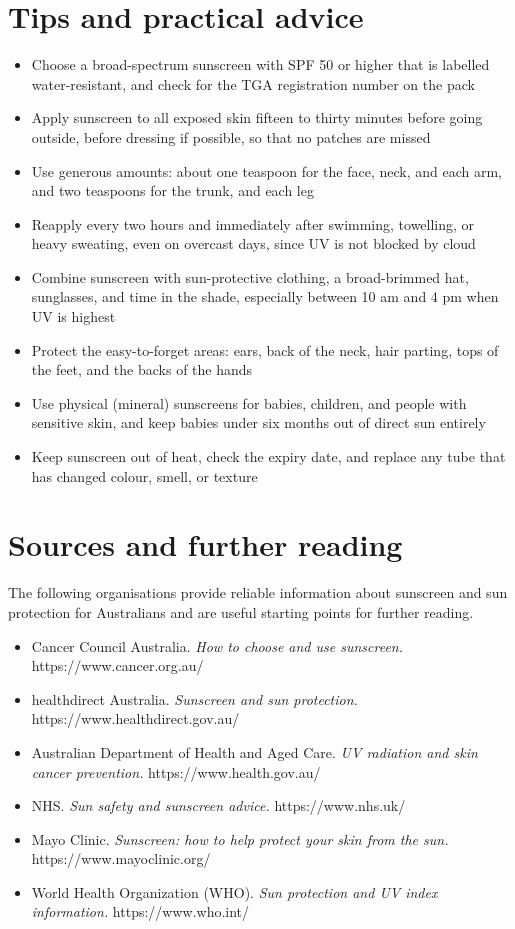 \section*{Tips and practical advice}
\begin{itemize}
    \item Choose a broad-spectrum sunscreen with SPF 50 or higher that is labelled water-resistant, and check for the TGA registration number on the pack
    \item Apply sunscreen to all exposed skin fifteen to thirty minutes before going outside, before dressing if possible, so that no patches are missed
    \item Use generous amounts: about one teaspoon for the face, neck, and each arm, and two teaspoons for the trunk, and each leg
    \item Reapply every two hours and immediately after swimming, towelling, or heavy sweating, even on overcast days, since UV is not blocked by cloud
    \item Combine sunscreen with sun-protective clothing, a broad-brimmed hat, sunglasses, and time in the shade, especially between 10 am and 4 pm when UV is highest
    \item Protect the easy-to-forget areas: ears, back of the neck, hair parting, tops of the feet, and the backs of the hands
    \item Use physical (mineral) sunscreens for babies, children, and people with sensitive skin, and keep babies under six months out of direct sun entirely
    \item Keep sunscreen out of heat, check the expiry date, and replace any tube that has changed colour, smell, or texture
\end{itemize}

\section*{Sources and further reading}
The following organisations provide reliable information about sunscreen and sun protection for Australians and are useful starting points for further reading.

\begin{itemize}
    \item Cancer Council Australia. \textit{How to choose and use sunscreen.} https://www.cancer.org.au/
    \item healthdirect Australia. \textit{Sunscreen and sun protection.} https://www.healthdirect.gov.au/
    \item Australian Department of Health and Aged Care. \textit{UV radiation and skin cancer prevention.} https://www.health.gov.au/
    \item NHS. \textit{Sun safety and sunscreen advice.} https://www.nhs.uk/
    \item Mayo Clinic. \textit{Sunscreen: how to help protect your skin from the sun.} https://www.mayoclinic.org/
    \item World Health Organization (WHO). \textit{Sun protection and UV index information.} https://www.who.int/
\end{itemize}

\clearpage
